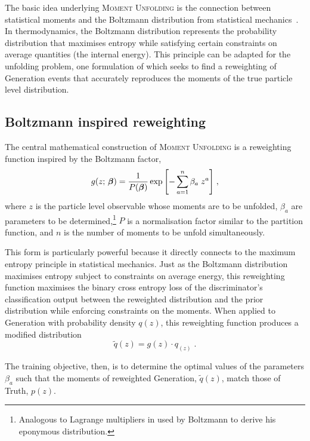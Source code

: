     The basic idea underlying \textsc{Moment Unfolding} is the connection between statistical moments and the Boltzmann distribution from statistical mechanics~\cite{Boltzmann1978AbleitungLichttheorie, Sharp2015Translation1909}.
    In thermodynamics, the Boltzmann distribution represents the probability distribution that maximises entropy while satisfying certain constraints on average quantities (the internal energy). 
    This principle can be adapted for the unfolding problem, one formulation of which seeks to find a reweighting of Generation events that accurately reproduces the moments of the true particle level distribution.
    
    \subsection{Boltzmann inspired reweighting}
        The central mathematical construction of \textsc{Moment Unfolding} is a reweighting function inspired by the Boltzmann factor,
        \[
            \label{eq:moment-generator}
            g(z;\,\vb*\beta) = \frac{1}{P(\vb*{\beta})} \exp\qty[-\sum_{a=1}^n \beta_a \; z^a]\;,
        \]
        where $z$ is the particle level observable whose moments are to be unfolded, $\beta_a$ are parameters to be determined,\footnote{Analogous to Lagrange multipliers in used by Boltzmann to derive his eponymous distribution.} $P$ is a normalisation factor similar to the partition function, and $n$ is the number of moments to be unfold simultaneously.

        This form is particularly powerful because it directly connects to the maximum entropy principle in statistical mechanics.
        Just as the Boltzmann distribution maximises entropy subject to constraints on average energy, this reweighting function maximises the binary cross entropy loss of the discriminator's classification output between the reweighted distribution and the prior distribution while enforcing constraints on the moments.
        When applied to Generation with probability density $q(z)$, this reweighting function produces a modified distribution
        \[
            \widetilde{q}(z) = g(z) \cdot q_(z)\;.
        \]
        
        The training objective, then, is to determine the optimal values of the parameters $\beta_a$ such that the moments of reweighted Generation, $\widetilde{q}(z)$, match those of Truth, \(p(z)\).
    
